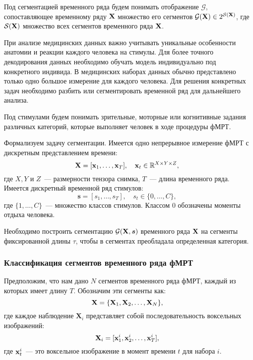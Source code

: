 \begin{definition}
Под сегментацией временного ряда будем понимать отображение $\mathcal{G}$, сопоставляющее временному ряду $\mathbf{X}$ множество его сегментов $\mathcal{G}(\mathbf{X}) \in 2^{\mathcal{S}(\mathbf{X})}$, где $\mathcal{S}(\mathbf{X})$ множество всех сегментов временного ряда $\mathbf{X}$.
\end{definition}

При анализе медицинских данных важно учитывать уникальные особенности анатомии и реакции каждого человека на стимулы. Для более точного декодирования данных необходимо обучать модель индивидуально под конкретного индивида. В медицинских наборах данных обычно представлено только одно большое измерение для каждого человека. Для решения конкретных задач необходимо разбить или сегментировать временной ряд для дальнейшего анализа. 
\begin{definition}
    Под стимулами будем понимать зрительные, моторные или когнитивные задания различных категорий, которые выполняет человек в ходе процедуры фМРТ.
\end{definition}
Формализуем задачу сегментации. Имеется одно непрерывное измерение фМРТ с дискретным представлением времени:
\begin{equation*}
	\mathbf{X} = [\mathbf{x}_{1}, \ldots, \mathbf{x}_{T}], \quad \mathbf{x}_{t} \in \mathbb{R}^{X \times Y \times Z},
\end{equation*}
где $X, Y$ и $Z$~--- размерности тензора снимка, $T$~--- длина временного ряда. 
Имеется дискретный временной ряд стимулов:
\begin{equation*}
	\bm{s} = [{s}_{1}, \ldots, {s}_{T}], \quad {s}_{t} \in \{0,\dots, C\},
\end{equation*}
где $\{1,\dots, C\}$~--- множество классов стимулов.
Классом $0$ обозначены моменты отдыха человека.

Необходимо построить сегментацию $\mathcal{G}(\mathbf{X}, \bm{s})$ временного ряда $\mathbf{X}$ на сегменты фиксированной длины $\tau$, чтобы в сегментах преобладала определенная категория.

\subsubsection{Классификация сегментов временного ряда фМРТ}
Предположим, что нам дано $N$ сегментов временного ряда фМРТ, каждый из которых имеет длину $T$. Обозначим эти сегменты как:
$$\mathbf{X} = \{\mathbf{X}_1, \mathbf{X}_2, \ldots, \mathbf{X}_N \},$$
где каждое наблюдение $\bm{X}_i$ представляет собой последовательность воксельных изображений:
$$\mathbf{X}_i = [\mathbf{x}_{1}^i, \mathbf{x}_{2}^i, \ldots, \mathbf{x}_{T}^i],$$
где $\mathbf{x}_{t}^i$~--- это воксельное изображение в момент времени $t$ для набора $i$.

